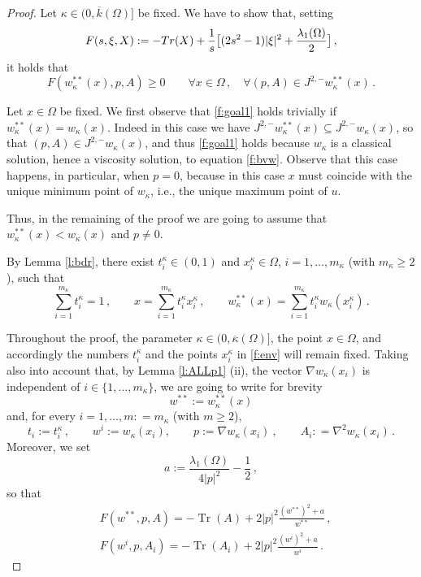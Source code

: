 \documentclass[10pt,a4paper]{amsart}
\def\Om{\Omega}
\DeclareMathOperator{\Tr}{Tr}
\def\k{\kappa}
\def\subjet{J^{2,-}}
\begin{document}
\begin{proof}
Let $\k \in (0, \overline k (\Om)]$ be fixed. We have to show that, setting  
$$F (s , \xi, X):= - {\rm {\rm Tr} } ( X)  + \frac{1}{s} \big [ ( 2 s ^ 2 -1 ) |\xi| ^ 2 +\frac{\lambda _ 1 (\Om) }{2} \big ] \,,$$ 
it holds that
\begin{equation}\label{f:goal1}
F ( w _\k ^{**}(x), p, A ) \geq 0 \qquad \forall x \in \Om \,, \quad \forall (p, A) \in \subjet w _\k  ^ { ** } ( x) \,.
\end{equation} 


Let $x \in \Om$ be fixed. 
We first observe that \eqref{f:goal1} holds trivially  if $w _\k ^{**}(x) = w _\k ( x)$. Indeed in this case we have  
$ \subjet w _\k  ^ { ** } ( x) \subseteq \subjet w _\k   ( x)$, so that 
$(p, A) \in \subjet w _\k   ( x)$, and thus \eqref{f:goal1} holds because $w _\k$ is a classical solution, hence a viscosity solution,  to equation \eqref{f:bvw}. 
Observe that this case happens, in particular, when $p=0$, because in this case $x$ must coincide with the unique minimum point of $w_\k$,
i.e., the unique maximum point of $u$.

Thus, in the remaining of the proof we are going to assume that $w _\k ^{**}(x) < w _\k ( x)$ and $p\neq 0$. 



By Lemma \ref{l:bdr}, there exist $t ^\k  _i \in (0, 1)$ and  $x ^\k _i \in \Om$, $i = 1, \dots, m_\k$ (with $m _\k \geq 2$), 
such that
\begin{equation}\label{f:env}
\sum _{i=1}^{m _\k} t ^\k  _i =1\,, \qquad
x = \sum _{i=1}
 ^{m _\k} t ^\k  _i x ^\k  _i\,, \qquad w^{**} _\k  (x)  = \sum _ { i = 1} ^{ m_\k} t ^\k   _i w _\k  ( x ^\k _i) \,.
\end{equation} 
 
Throughout the proof, the parameter
$\k \in (0, \overline \k (\Om)]$, the point $x \in \Om$, and accordingly the
numbers $t^\k _i $ and  the points $x^\k _i $ in \eqref{f:env}  will remain fixed. 
Taking also into account that,  by Lemma \ref{l:ALLp1} (ii), the vector  $\nabla  w  _\k ( x_i)$  is  independent of  $i \in \{ 1, \dots, m _\k\}$,
we are going to write for brevity  
$$w ^{**} := w^{**} _\k  (x)$$
and, for every $i = 1, \dots, m: = m _\k$ (with $m \geq 2$), 
$$t_i:= t ^ \k _ i \, , \qquad w^i:= w  _\k ( x_i),    \qquad p:= \nabla  w  _\k ( x_i)\ , \qquad A _{ i}: = \nabla ^ 2 w _\k  ( x_i) \,.$$ 
Moreover, we set 
 \begin{equation}\label{f:defa} 
 a:=  \frac{\lambda _1 (\Om)}{4| p | ^ 2 } - \frac 1 2 \,,
 \end{equation}
so that
$$\begin{aligned}
& F (w^{**}, p, A )  = - \Tr (A)+  2 |p| ^ 2 \frac{(w^{**} ) ^ 2 + a}{w ^ {**}}\,,
\\ 
& F (w^i, p, A_i )  =- \Tr (A_i) + 2 |p| ^ 2 \frac{(w^{i} ) ^ 2 + a}{w ^ {i}} \,.  
 \end{aligned}$$
  

\end{proof}
\end{document}

